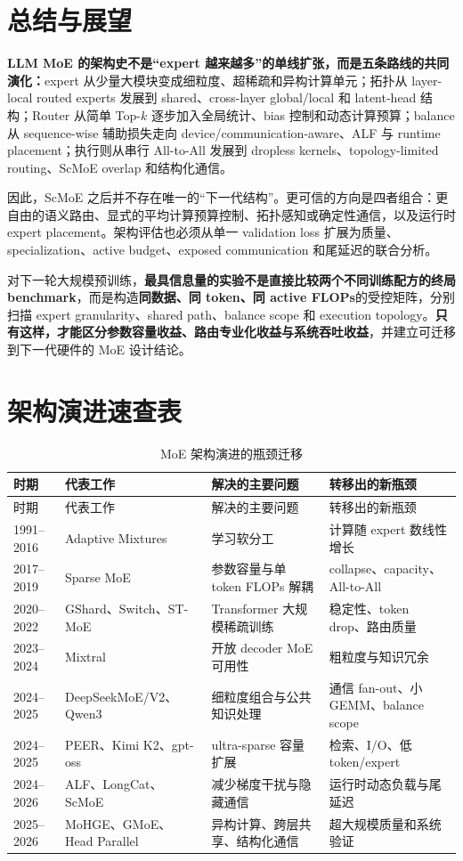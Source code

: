 \documentclass[10pt,a4paper,fontset=none]{ctexart}
\newcommand{\term}[1]{\textbf{#1}}
\begin{document}
\section{总结与展望}

\term{LLM MoE 的架构史不是“expert 越来越多”的单线扩张，而是五条路线的共同演化：}expert 从少量大模块变成细粒度、超稀疏和异构计算单元；拓扑从 layer-local routed experts 发展到 shared、cross-layer global/local 和 latent-head 结构；Router 从简单 Top-$k$ 逐步加入全局统计、bias 控制和动态计算预算；balance 从 sequence-wise 辅助损失走向 device/communication-aware、ALF 与 runtime placement；执行则从串行 All-to-All 发展到 dropless kernels、topology-limited routing、ScMoE overlap 和结构化通信。

因此，ScMoE 之后并不存在唯一的“下一代结构”。更可信的方向是四者组合：更自由的语义路由、显式的平均计算预算控制、拓扑感知或确定性通信，以及运行时 expert placement。架构评估也必须从单一 validation loss 扩展为质量、specialization、active budget、exposed communication 和尾延迟的联合分析。

对下一轮大规模预训练，\term{最具信息量的实验不是直接比较两个不同训练配方的终局 benchmark}，而是构造\textbf{同数据、同 token、同 active FLOPs}的受控矩阵，分别扫描 expert granularity、shared path、balance scope 和 execution topology。\textbf{只有这样，才能区分参数容量收益、路由专业化收益与系统吞吐收益}，并建立可迁移到下一代硬件的 MoE 设计结论。

\appendix
\section{架构演进速查表}

\begin{longtable}{@{}p{}p{}p{}p{}@{}}
\caption{MoE 架构演进的瓶颈迁移}\label{tab:timeline}\\
\toprule
时期 & 代表工作 & 解决的主要问题 & 转移出的新瓶颈 \\
\midrule
\endfirsthead
\toprule
时期 & 代表工作 & 解决的主要问题 & 转移出的新瓶颈 \\
\midrule
\endhead
1991--2016 & Adaptive Mixtures & 学习软分工 & 计算随 expert 数线性增长 \\
2017--2019 & Sparse MoE & 参数容量与单 token FLOPs 解耦 & collapse、capacity、All-to-All \\
2020--2022 & GShard、Switch、ST-MoE & Transformer 大规模稀疏训练 & 稳定性、token drop、路由质量 \\
2023--2024 & Mixtral & 开放 decoder MoE 可用性 & 粗粒度与知识冗余 \\
2024--2025 & DeepSeekMoE/V2、Qwen3 & 细粒度组合与公共知识处理 & 通信 fan-out、小 GEMM、balance scope \\
2024--2025 & PEER、Kimi K2、gpt-oss & ultra-sparse 容量扩展 & 检索、I/O、低 token/expert \\
2024--2026 & ALF、LongCat、ScMoE & 减少梯度干扰与隐藏通信 & 运行时动态负载与尾延迟 \\
2025--2026 & MoHGE、GMoE、Head Parallel & 异构计算、跨层共享、结构化通信 & 超大规模质量和系统验证 \\
\bottomrule
\end{longtable}
\end{document}
